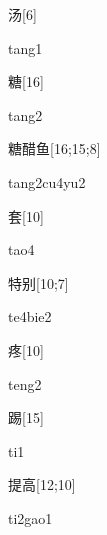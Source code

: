 \begin{verbete}[tang1]{汤}[6]
\begin{pronuncia}{tang1}
\end{pronuncia}
\end{verbete}

\begin{verbete}[tang2]{糖}[16]
\begin{pronuncia}{tang2}
\end{pronuncia}
\end{verbete}

\begin{verbete}[tang2cu4yu2]{糖醋鱼}[16;15;8]
\begin{pronuncia}{tang2cu4yu2}
\end{pronuncia}
\end{verbete}

\begin{verbete}[tao4]{套}[10]
\begin{pronuncia}{tao4}
\end{pronuncia}
\end{verbete}

\begin{verbete}[te4bie2]{特别}[10;7]
\begin{pronuncia}{te4bie2}
\end{pronuncia}
\end{verbete}

\begin{verbete}[teng2]{疼}[10]
\begin{pronuncia}{teng2}
\end{pronuncia}
\end{verbete}

\begin{verbete}[ti1]{踢}[15]
\begin{pronuncia}{ti1}
\end{pronuncia}
\end{verbete}

\begin{verbete}[ti2gao1]{提高}[12;10]
\begin{pronuncia}{ti2gao1}
\end{pronuncia}
\end{verbete}

